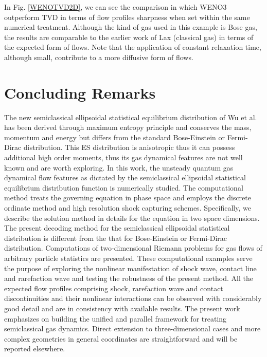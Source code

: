 \documentclass{rsproca}%
\begin{document}
In Fig. \ref{WENOTVD2D}, we can see the comparison in which WENO3 outperform TVD in terms of flow profiles sharpness when set within the same numerical treatment. Although the kind of gas used in this example is Bose gas, the results are comparable to the earlier work of Lax \cite{Laxliu95} (classical gas) in terms of the expected form of flows. Note that the application of constant relaxation time, although small, contribute to a more diffusive form of flows.

\section{Concluding Remarks}
\label{remarks}
The new semiclassical ellipsoidal statistical equilibrium distribution of Wu et al. \cite{Wu2012} has been derived through maximum entropy principle and conserves the mass, momentum and energy but differs from the standard Bose-Einstein or Fermi-Dirac distribution.  This ES distribution is anisotropic thus it can possess additional high order moments, thus its gas dynamical features are not well known and are worth exploring.   In this work, the unsteady quantum gas dynamical flow features as dictated by the semiclassical ellipsoidal statistical equilibrium distribution function is numerically studied.   The computational method treats the governing equation in phase space and employs the discrete ordinate method and high resolution shock capturing schemes.  Specifically, we describe the solution method in details for the equation in two space dimensions.   The present decoding method for the semiclassical ellipsoidal statistical distribution is different from the that for Bose-Einstein or Fermi-Dirac distribution.   Computations of two-dimensional Riemann problems for gas flows of arbitrary particle statistics are presented.  These computational examples serve the purpose of exploring the nonlinear manifestation of shock wave, contact line and rarefaction wave and testing the robustness of the present method.   All the expected flow profiles comprising shock, rarefaction wave and contact discontinuities and their nonlinear interactions can be observed with considerably good detail and are in consistency with available results.   The present work emphasizes on building the unified and parallel framework for treating semiclassical gas dynamics.   Direct extension to three-dimensional cases and more complex geometries in general coordinates are straightforward and will be reported elsewhere.

\end{document}
